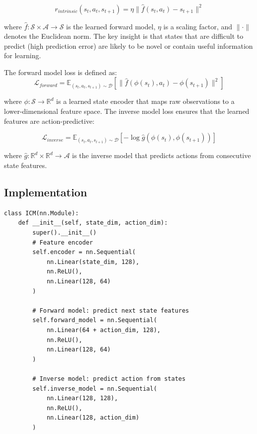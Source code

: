 \documentclass[12pt]{article}
\begin{document}
{{{\begin{equation}
r_{intrinsic}(s_t, a_t, s_{t+1}) = \eta \| \hat{f}(s_t, a_t) - s_{t+1} \|^2
\end{equation}

where $\hat{f}: \mathcal{S} \times \mathcal{A} \rightarrow \mathcal{S}$ is the learned forward model, $\eta$ is a scaling factor, and $\|\cdot\|$ denotes the Euclidean norm. The key insight is that states that are difficult to predict (high prediction error) are likely to be novel or contain useful information for learning.

The forward model loss is defined as:
\begin{equation}
\mathcal{L}_{forward} = \mathbb{E}_{(s_t, a_t, s_{t+1}) \sim \mathcal{D}} \left[ \| \hat{f}(\phi(s_t), a_t) - \phi(s_{t+1}) \|^2 \right]
\end{equation}

where $\phi: \mathcal{S} \rightarrow \mathbb{R}^d$ is a learned state encoder that maps raw observations to a lower-dimensional feature space. The inverse model loss ensures that the learned features are action-predictive:

\begin{equation}
\mathcal{L}_{inverse} = \mathbb{E}_{(s_t, a_t, s_{t+1}) \sim \mathcal{D}} \left[ -\log \hat{g}(\phi(s_t), \phi(s_{t+1})) \right]
\end{equation}

where $\hat{g}: \mathbb{R}^d \times \mathbb{R}^d \rightarrow \mathcal{A}$ is the inverse model that predicts actions from consecutive state features.

\subsection{Implementation}

\begin{verbatim}
class ICM(nn.Module):
    def __init__(self, state_dim, action_dim):
        super().__init__()
        # Feature encoder
        self.encoder = nn.Sequential(
            nn.Linear(state_dim, 128),
            nn.ReLU(),
            nn.Linear(128, 64)
        )
        
        # Forward model: predict next state features
        self.forward_model = nn.Sequential(
            nn.Linear(64 + action_dim, 128),
            nn.ReLU(),
            nn.Linear(128, 64)
        )
        
        # Inverse model: predict action from states
        self.inverse_model = nn.Sequential(
            nn.Linear(128, 128),
            nn.ReLU(),
            nn.Linear(128, action_dim)
        )
    

\end{verbatim}}}}
\end{document}
